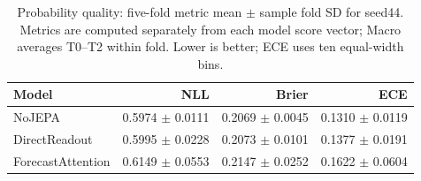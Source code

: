 \begin{table}[t]
\centering
\small
\caption{Probability quality: five-fold metric mean $\pm$ sample fold SD for seed44. Metrics are computed separately from each model score vector; Macro averages T0--T2 within fold. Lower is better; ECE uses ten equal-width bins.}
\label{tab:calibration}
\begin{tabular}{lrrr}
\toprule
Model & NLL & Brier & ECE \\
\midrule
NoJEPA & 0.5974 $\pm$ 0.0111 & 0.2069 $\pm$ 0.0045 & 0.1310 $\pm$ 0.0119 \\
DirectReadout & 0.5995 $\pm$ 0.0228 & 0.2073 $\pm$ 0.0101 & 0.1377 $\pm$ 0.0191 \\
ForecastAttention & 0.6149 $\pm$ 0.0553 & 0.2147 $\pm$ 0.0252 & 0.1622 $\pm$ 0.0604 \\
\bottomrule
\end{tabular}
\end{table}
